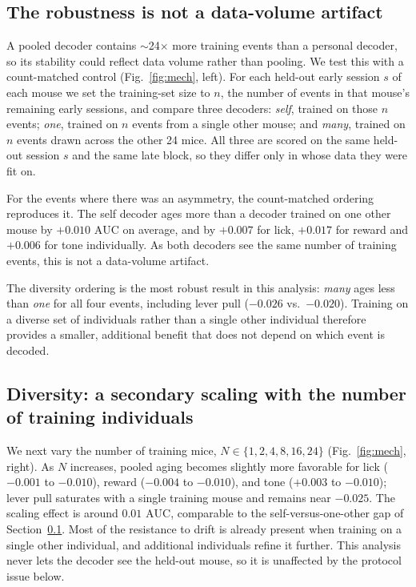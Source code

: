 \documentclass[mlabstract,onecolumn]{jmlr}
\newcommand{\auc}{\mathrm{AUC}}
\begin{document}
\subsection{The robustness is not a data-volume artifact}
\label{sec:matched}
A pooled decoder contains $\sim$24$\times$ more training events than a personal decoder, so its
stability could reflect data volume rather than pooling. We test this with a count-matched control
(Fig.~\ref{fig:mech}, left). For each held-out early session $s$ of each mouse we set the
training-set size to $n$, the number of events in that mouse's remaining early sessions, and compare
three decoders: \emph{self}, trained on those $n$ events; \emph{one}, trained on $n$ events from a
single other mouse; and \emph{many}, trained on $n$ events drawn across the other 24 mice. All three
are scored on the same held-out session $s$ and the same late block, so they differ only in whose
data they were fit on.

For the events where there was an asymmetry, the count-matched ordering reproduces it. The self
decoder ages more than a decoder trained on one other mouse by $+0.010$ $\auc$ on average, and by
$+0.007$ for lick, $+0.017$ for reward and $+0.006$ for tone individually. As both decoders see the
same number of training events, this is not a data-volume artifact.

The diversity ordering is the most robust result in this analysis: \emph{many} ages less than
\emph{one} for all four events, including lever pull ($-0.026$ vs.\ $-0.020$). Training on a diverse
set of individuals rather than a single other individual therefore provides a smaller, additional
benefit that does not depend on which event is decoded.

\subsection{Diversity: a secondary scaling with the number of training individuals}
\label{sec:scaling}
We next vary the number of training mice, $N \in \{1, 2, 4, 8, 16, 24\}$ (Fig.~\ref{fig:mech},
right). As $N$ increases, pooled aging becomes slightly more favorable for lick ($-0.001$ to
$-0.010$), reward ($-0.004$ to $-0.010$), and tone ($+0.003$ to $-0.010$); lever pull saturates with
a single training mouse and remains near $-0.025$. The scaling effect is around $0.01$ $\auc$,
comparable to the self-versus-one-other gap of Section~\ref{sec:matched}. Most of the resistance to
drift is already present when training on a single other individual, and additional individuals
refine it further. This analysis never lets the decoder see the held-out mouse, so it is unaffected
by the protocol issue below.
\end{document}
